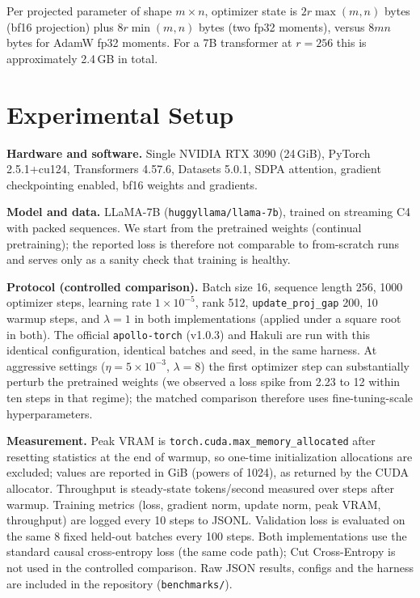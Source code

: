 \documentclass[11pt]{article}
\begin{document}
Per projected parameter of shape $m \times n$, optimizer state is
$2 r \max(m,n)$ bytes (bf16 projection) plus $8 r \min(m,n)$ bytes (two fp32
moments), versus $8mn$ bytes for AdamW fp32 moments. For a 7B transformer at
$r=256$ this is approximately 2.4\,GB in total.

\section{Experimental Setup}
\label{sec:setup}

\textbf{Hardware and software.} Single NVIDIA RTX 3090 (24\,GiB), PyTorch
2.5.1+cu124, Transformers 4.57.6, Datasets 5.0.1, SDPA attention, gradient
checkpointing enabled, bf16 weights and gradients.

\textbf{Model and data.} LLaMA-7B (\texttt{huggyllama/llama-7b}), trained on
streaming C4 \citep{raffel2020t5} with packed sequences. We start from the pretrained
weights (continual pretraining); the reported loss is therefore not
comparable to from-scratch runs and serves only as a sanity check that
training is healthy.

\textbf{Protocol (controlled comparison).} Batch size 16, sequence length
256, 1000 optimizer steps, learning rate $1\times10^{-5}$, rank 512,
\texttt{update\_proj\_gap} 200, 10 warmup
steps, and $\lambda=1$ in both implementations (applied under a square root
in both). The official \texttt{apollo-torch} (v1.0.3) and Hakuli are run with
this identical configuration, identical batches and seed, in the same
harness. At aggressive settings ($\eta=5\times10^{-3}$, $\lambda=8$) the
first optimizer step can substantially perturb the pretrained weights (we
observed a loss spike from 2.23 to 12 within ten steps in that regime); the
matched comparison therefore uses fine-tuning-scale hyperparameters.

\textbf{Measurement.} Peak VRAM is \texttt{torch.cuda.max\_memory\_allocated}
after resetting statistics at the end of warmup, so one-time initialization
allocations are excluded; values are reported in GiB (powers of 1024), as
returned by the CUDA allocator. Throughput is steady-state tokens/second
measured over steps after warmup. Training metrics (loss, gradient norm,
update norm, peak VRAM, throughput) are logged every 10 steps to JSONL.
Validation loss is evaluated on the same 8 fixed held-out batches every 100
steps. Both implementations use the standard causal cross-entropy loss (the
same code path); Cut Cross-Entropy is not used in the controlled comparison.
Raw JSON results, configs
and the harness are included in the repository (\texttt{benchmarks/}).
\end{document}
